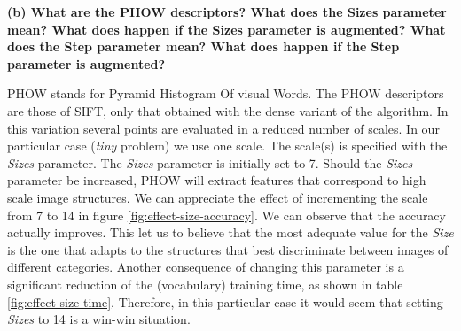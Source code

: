 {\bfseries (b) What are the PHOW descriptors? What does the Sizes parameter mean? What does happen if the Sizes parameter is augmented? What does the Step parameter mean? What does happen if the Step parameter is augmented?}

PHOW stands for Pyramid Histogram Of visual Words. The PHOW descriptors are those of SIFT, only that obtained with the dense variant of the algorithm. In this variation several points are evaluated in a reduced number of scales. In our particular case (\emph{tiny} problem) we use one scale. The scale(s) is specified with the \emph{Sizes} parameter. The \emph{Sizes} parameter is initially set to 7. Should the \emph{Sizes} parameter be increased, PHOW will extract features that correspond to high scale image structures.  We can appreciate the effect of incrementing the scale from 7 to 14 in figure \ref{fig:effect-size-accuracy}. We can observe that the accuracy actually improves. This let us to believe that the most adequate value for the \emph{Size} is the one that adapts to the structures that best discriminate between images of different categories. Another consequence of changing this parameter is a significant reduction of the (vocabulary) training time, as shown in table \ref{fig:effect-size-time}. Therefore, in this particular case it would seem that setting \emph{Sizes} to 14 is a win-win situation.

